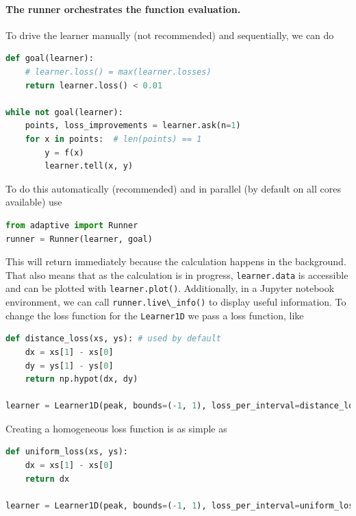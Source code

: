 \hypertarget{the-runner-orchestrates-the-function-evaluation.}{%
\paragraph{The runner orchestrates the function evaluation.}\label{the-runner-orchestrates-the-function-evaluation.}}

To drive the learner manually (not recommended) and sequentially, we can do

\begin{lstlisting}[language=Python]
def goal(learner):
    # learner.loss() = max(learner.losses)
    return learner.loss() < 0.01

while not goal(learner):
    points, loss_improvements = learner.ask(n=1)
    for x in points:  # len(points) == 1
        y = f(x)
        learner.tell(x, y)
\end{lstlisting}

To do this automatically (recommended) and in parallel (by default on all cores available) use

\begin{lstlisting}[language=Python]
from adaptive import Runner
runner = Runner(learner, goal)
\end{lstlisting}

This will return immediately because the calculation happens in the background.
That also means that as the calculation is in progress, \passthrough{\lstinline!learner.data!} is accessible and can be plotted with \passthrough{\lstinline!learner.plot()!}.
Additionally, in a Jupyter notebook environment, we can call \passthrough{\lstinline!runner.live\_info()!} to display useful information.
To change the loss function for the \passthrough{\lstinline!Learner1D!} we pass a loss function, like

\begin{lstlisting}[language=Python]
def distance_loss(xs, ys): # used by default
    dx = xs[1] - xs[0]
    dy = ys[1] - ys[0]
    return np.hypot(dx, dy)

learner = Learner1D(peak, bounds=(-1, 1), loss_per_interval=distance_loss)
\end{lstlisting}

Creating a homogeneous loss function is as simple as

\begin{lstlisting}[language=Python]
def uniform_loss(xs, ys):
    dx = xs[1] - xs[0]
    return dx

learner = Learner1D(peak, bounds=(-1, 1), loss_per_interval=uniform_loss)
\end{lstlisting}

